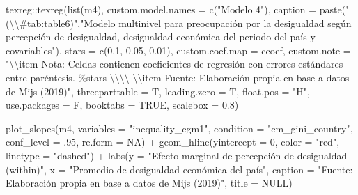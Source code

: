 \documentclass[
  12pt,
  a4paper,
]{article}
\newenvironment{Shaded}{\begin{snugshade}}{\end{snugshade}}
\newcommand{\AttributeTok}[1]{\textcolor[rgb]{0.77,0.63,0.00}{#1}}
\newcommand{\ConstantTok}[1]{\textcolor[rgb]{0.00,0.00,0.00}{#1}}
\newcommand{\DecValTok}[1]{\textcolor[rgb]{0.00,0.00,0.81}{#1}}
\newcommand{\FloatTok}[1]{\textcolor[rgb]{0.00,0.00,0.81}{#1}}
\newcommand{\FunctionTok}[1]{\textcolor[rgb]{0.00,0.00,0.00}{#1}}
\newcommand{\NormalTok}[1]{#1}
\newcommand{\SpecialCharTok}[1]{\textcolor[rgb]{0.00,0.00,0.00}{#1}}
\newcommand{\StringTok}[1]{\textcolor[rgb]{0.31,0.60,0.02}{#1}}
\begin{document}
\begin{Shaded}
\begin{Highlighting}[]
\NormalTok{texreg}\SpecialCharTok{::}\FunctionTok{texreg}\NormalTok{(}\FunctionTok{list}\NormalTok{(m4),}
               \AttributeTok{custom.model.names =} \FunctionTok{c}\NormalTok{(}\StringTok{"Modelo 4"}\NormalTok{),}
               \AttributeTok{caption =} \FunctionTok{paste}\NormalTok{(}\StringTok{"(}\SpecialCharTok{\textbackslash{}\textbackslash{}}\StringTok{\#tab:table6)"}\NormalTok{,}\StringTok{"Modelo multinivel para preocupación por la desigualdad según percepción de desigualdad, desigualdad económica del periodo del país y covariables"}\NormalTok{),}
               \AttributeTok{stars =} \FunctionTok{c}\NormalTok{(}\FloatTok{0.1}\NormalTok{, }\FloatTok{0.05}\NormalTok{, }\FloatTok{0.01}\NormalTok{),}
               \AttributeTok{custom.coef.map =}\NormalTok{ ccoef,}
               \AttributeTok{custom.note =} \StringTok{"}\SpecialCharTok{\textbackslash{}\textbackslash{}}\StringTok{item Nota: Celdas contienen coeficientes de regresión con errores estándares entre paréntesis. \%stars }\SpecialCharTok{\textbackslash{}\textbackslash{}\textbackslash{}\textbackslash{}}\StringTok{ }\SpecialCharTok{\textbackslash{}\textbackslash{}}\StringTok{item Fuente: Elaboración propia en base a datos de Mijs (2019)"}\NormalTok{,}
               \AttributeTok{threeparttable =}\NormalTok{ T,}
               \AttributeTok{leading.zero =}\NormalTok{ T,}
               \AttributeTok{float.pos =} \StringTok{"H"}\NormalTok{,}
               \AttributeTok{use.packages =}\NormalTok{ F,}
               \AttributeTok{booktabs =} \ConstantTok{TRUE}\NormalTok{,}
               \AttributeTok{scalebox =} \FloatTok{0.8}\NormalTok{)}


\FunctionTok{plot\_slopes}\NormalTok{(m4, }
            \AttributeTok{variables =} \StringTok{"inequality\_cgm1"}\NormalTok{, }
            \AttributeTok{condition =} \StringTok{"cm\_gini\_country"}\NormalTok{,}
            \AttributeTok{conf\_level =}\NormalTok{ .}\DecValTok{95}\NormalTok{,}
            \AttributeTok{re.form =} \ConstantTok{NA}\NormalTok{) }\SpecialCharTok{+}
  \FunctionTok{geom\_hline}\NormalTok{(}\AttributeTok{yintercept =} \DecValTok{0}\NormalTok{, }
             \AttributeTok{color =} \StringTok{"red"}\NormalTok{, }
             \AttributeTok{linetype =} \StringTok{"dashed"}\NormalTok{) }\SpecialCharTok{+}
  \FunctionTok{labs}\NormalTok{(}\AttributeTok{y =} \StringTok{"Efecto marginal de percepción de desigualdad (within)"}\NormalTok{,}
       \AttributeTok{x =} \StringTok{"Promedio de desigualdad económica del país"}\NormalTok{,}
       \AttributeTok{caption =} \StringTok{"Fuente: Elaboración propia en base a datos de Mijs (2019)"}\NormalTok{,}
       \AttributeTok{title =} \ConstantTok{NULL}\NormalTok{)}


\end{Highlighting}
\end{Shaded}
\end{document}
